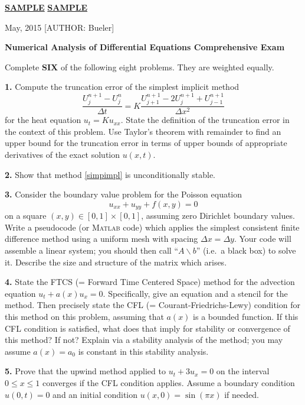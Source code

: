 \documentclass[11pt]{amsart}
\newcommand{\subheading}[1]{\medskip\noindent \textbf{#1.}\quad}
\begin{document}
\thispagestyle{empty}
\Large \noindent \underline{\textbf{SAMPLE}} \hfill\underline{\textbf{SAMPLE}}

\scriptsize {} May, 2015  \hfill  \tiny [AUTHOR: Bueler]
\normalsize\bigskip

\centerline{\large\textbf{Numerical Analysis of Differential Equations Comprehensive Exam}}
\bigskip

\centerline{Complete {\bf SIX} of the following eight problems.  They are weighted equally.}
\bigskip

\subheading{1}  Compute the truncation error of the simplest implicit method
\begin{equation}\label{simpimpl}
\frac{U_j^{n+1} - U_j^n}{\Delta t} = K \frac{U_{j+1}^{n+1} - 2 U_j^{n+1} + U_{j-1}^{n+1}}{\Delta x^2}
\end{equation}
for the heat equation $u_t = K u_{xx}$.  State the definition of the truncation error in the context of this problem.  Use Taylor's theorem with remainder to find an upper bound for the truncation error in terms of upper bounds of appropriate derivatives of the exact solution $u(x,t)$.

\subheading{2}  Show that method \eqref{simpimpl} is unconditionally stable.

\subheading{3}  Consider the boundary value problem for the Poisson equation
    $$u_{xx} + u_{yy} + f(x,y) = 0$$
on a square $(x,y) \in [0,1]\times[0,1]$, assuming zero Dirichlet boundary values.  Write a pseudocode (or \textsc{Matlab} code) which applies the simplest consistent finite difference method using a uniform mesh with spacing $\Delta x = \Delta y$.  Your code will assemble a linear system; you should then call ``$A\backslash b$'' (i.e.~a black box) to solve it.  Describe the size and structure of the matrix which arises.

\subheading{4}  State the FTCS (= Forward Time Centered Space) method for the advection equation $u_t + a(x) u_x = 0$.  Specifically, give an equation and a stencil for the method.  Then precisely state the CFL (= Courant-Friedrichs-Lewy) condition for this method on this problem, assuming that $a(x)$ is a bounded function.  If this CFL condition is satisfied, what does that imply for stability or convergence of this method?  If not?  Explain via a stability analysis of the method; you may assume $a(x)=a_0$ is constant in this stability analysis.

\subheading{5}  Prove that the upwind method applied to $u_t + 3 u_x = 0$ on the interval $0 \le x \le 1$ converges if the CFL condition applies.  Assume a boundary condition $u(0,t)=0$ and an initial condition $u(x,0)=\sin(\pi x)$ if needed.
\end{document}
